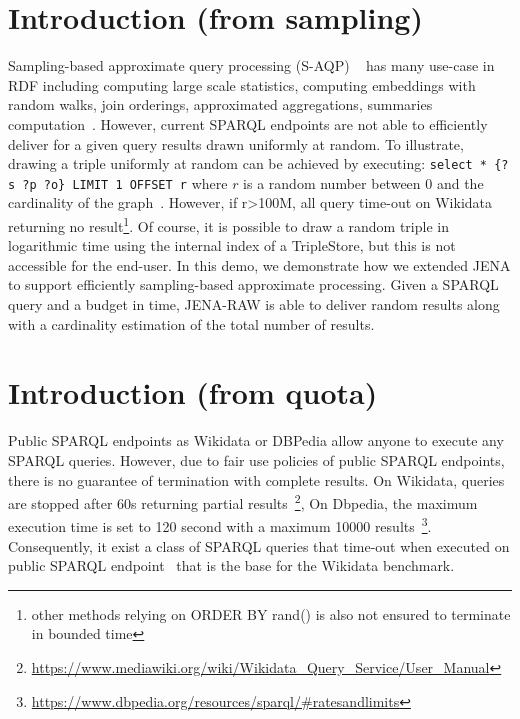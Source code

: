 
\section{Introduction (from sampling)}

Sampling-based approximate query processing (S-AQP)
~\cite{DBLP:conf/sigmod/AgarwalMKTJMMS14} has many use-case in RDF
including computing large scale
statistics\cite{soulet2019anytime,10.1007/978-3-319-18818-8_14},
computing embeddings with random walks\cite{ristoski2016rdf2vec}, join
orderings\cite{DBLP:conf/cidr/LeisRGK017}, approximated
aggregations\cite{DBLP:journals/tods/LiWYZ19}, summaries
computation~\cite{10.1007/978-3-030-49461-2_10}. However, current
SPARQL endpoints are not able to efficiently deliver for a given query
results drawn uniformly at random. To illustrate, drawing a triple
uniformly at random can be achieved by executing:
%
\verb+select * {?s ?p ?o} LIMIT 1 OFFSET r+
%
where $r$ is a random number between 0 and the cardinality of the
graph~\cite{soulet2019anytime}. However, if r>100M, all query time-out
on Wikidata returning no result\footnote{other methods relying on
  ORDER BY rand() is also not ensured to terminate in bounded time
}. Of course, it is possible to draw a random triple in logarithmic
time using the internal index of a TripleStore, but this is not
accessible for the end-user. In this demo, we demonstrate how we
extended JENA to support efficiently sampling-based approximate
processing. Given a SPARQL query and a budget in time, JENA-RAW is
able to deliver random results along with a cardinality estimation of
the total number of results.






\section{Introduction (from quota)}

Public SPARQL endpoints as Wikidata or DBPedia allow anyone to execute
any SPARQL queries. However, due to fair use policies of public SPARQL
endpoints, there is no guarantee of termination with complete
results. On Wikidata, queries are stopped after 60s returning partial
results~\footnote{\url{https://www.mediawiki.org/wiki/Wikidata_Query_Service/User_Manual}},
On Dbpedia, the maximum execution time is set to 120 second with a
maximum 10000
results~\footnote{\url{https://www.dbpedia.org/resources/sparql/\#ratesandlimits}}. Consequently,
it exist a class of SPARQL queries that time-out when executed on
public SPARQL endpoint~\cite{DBLP:conf/semweb/MalyshevKGGB18} that is
the base for the Wikidata benchmark\cite{angles2022wdbench}.

